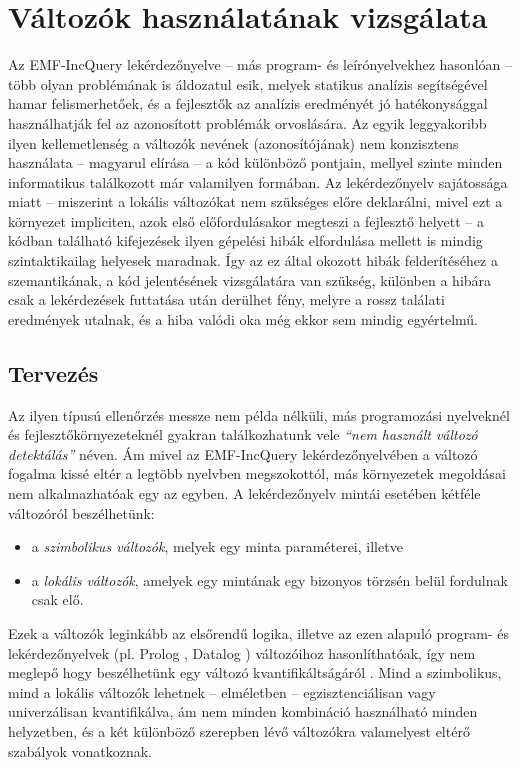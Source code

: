 \chapter{Változók használatának vizsgálata}
\label{chap:varUsage}
%
%
Az EMF-IncQuery lekérdezőnyelve -- más program- és leírónyelvekhez hasonlóan -- több olyan problémának is áldozatul esik, melyek statikus analízis segítségével hamar felismerhetőek, és a fejlesztők az analízis eredményét jó hatékonysággal használhatják fel az azonosított problémák orvoslására.
Az egyik leggyakoribb ilyen kellemetlenség a változók nevének (azonosítójának) nem konzisztens használata -- magyarul elírása -- a kód különböző pontjain, mellyel szinte minden informatikus találkozott már valamilyen formában.
Az lekérdezőnyelv sajátossága miatt -- miszerint a lokális változókat nem szükséges előre deklarálni, mivel ezt a környezet impliciten, azok első előfordulásakor megteszi a fejlesztő helyett -- a kódban található kifejezések ilyen gépelési hibák elfordulása mellett is mindig szintaktikailag helyesek maradnak.
Így az ez által okozott hibák felderítéséhez a szemantikának, a kód jelentésének vizsgálatára van szükség, különben a hibára csak a lekérdezések futtatása után derülhet fény, melyre a rossz találati eredmények utalnak, és a hiba valódi oka még ekkor sem mindig egyértelmű.

\section{Tervezés}

Az ilyen típusú ellenőrzés messze nem példa nélküli, más programozási nyelveknél és fejlesztőkörnyezeteknél gyakran találkozhatunk vele \emph{``nem használt változó detektálás''} néven.
Ám mivel az EMF-IncQuery lekérdezőnyelvében a változó fogalma kissé eltér a legtöbb nyelvben megszokottól, más környezetek megoldásai nem alkalmazhatóak egy az egyben.
A lekérdezőnyelv mintái esetében kétféle változóról beszélhetünk:
\begin{itemize}
    \item a \emph{szimbolikus változók}, melyek egy minta paraméterei, illetve
    \item a \emph{lokális változók}, amelyek egy mintának egy bizonyos törzsén belül fordulnak csak elő.
\end{itemize}
Ezek a változók leginkább az elsőrendű logika, illetve az ezen alapuló program- és lekérdezőnyelvek (pl. Prolog \cite{Colmerauer93thebirth}, Datalog \cite{Ceri:1989:YAW:627272.627357}) változóihoz hasonlíthatóak, így nem meglepő hogy beszélhetünk egy változó kvantifikáltságáról \cite{Huth:2004:LCS:975331}.
Mind a szimbolikus, mind a lokális változók lehetnek -- elméletben -- egzisztenciálisan vagy univerzálisan kvantifikálva, ám nem minden kombináció használható minden helyzetben, és a két különböző szerepben lévő változókra valamelyest eltérő szabályok vonatkoznak.

